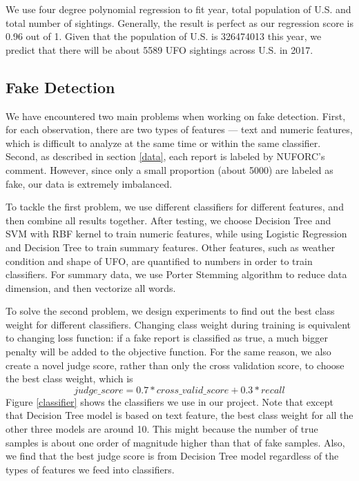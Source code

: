 We use four degree polynomial regression to fit year, total population of U.S. and total number of sightings. Generally, the result is perfect as our regression score is 0.96 out of 1. Given that the population of U.S. is 326474013 this year, we predict that there will be about 5589 UFO sightings across U.S. in 2017.

\subsection{Fake Detection}

We have encountered two main problems when working on fake detection. First, for each observation, there are two types of features --- text and numeric features, which is difficult to analyze at the same time or within the same classifier. Second, as described in section \ref{data}, each report is labeled by NUFORC's comment. However, since only a small proportion (about 5000) are labeled as fake, our data is extremely imbalanced.

To tackle the first problem, we use different classifiers for different features, and then combine all results together. After testing, we choose Decision Tree and SVM with RBF kernel to train numeric features, while using Logistic Regression and Decision Tree to train summary features. Other features, such as weather condition and shape of UFO, are quantified to numbers in order to train classifiers. For summary data, we use Porter Stemming algorithm to reduce data dimension, and then vectorize all words.

To solve the second problem, we design experiments to find out the best class weight for different classifiers. Changing class weight during training is equivalent to changing loss function: if a fake report is classified as true, a much bigger penalty will be added to the objective function. For the same reason, we also create a novel judge score, rather than only the cross validation score, to choose the best class weight, which is
$$
judge\_score = 0.7 * cross\_valid\_score + 0.3 * recall
$$
Figure \ref{classifier} shows the classifiers we use in our project. Note that except that Decision Tree model is based on text feature, the best class weight for all the other three models are around 10. This might because the number of true samples is about one order of magnitude higher than that of fake samples. Also, we find that the best judge score is from Decision Tree model regardless of the types of features we feed into classifiers. 

